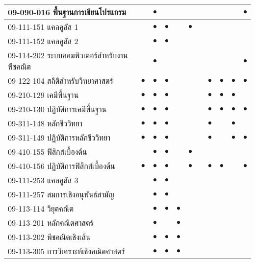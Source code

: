 \begin{longtable}{|>{\raggedright}p{}|c|c|c|c|c|c|c|c|c|c|}
	09-090-016 พื้นฐานการเขียนโปรแกรม&&{\Large$\bullet$}&&&&&&&&{\Large$\bullet$}\\
	\hline
	09-111-151 แคลคูลัส 1&&{\Large$\bullet$}&{\Large$\bullet$}&&{\Large$\bullet$}&&&&&\\
	\hline
	09-111-152 แคลคูลัส 2
	&&{\Large$\bullet$}&{\Large$\bullet$}&&&&&&&\\
	\hline
	09-114-202 ระบบคอมพิวเตอร์สำหรับงานพีชคณิต&&{\Large$\bullet$}&&&&&&&&{\Large$\bullet$}\\
	\hline
	09-122-104 สถิติสำหรับวิทยาศาสตร์&{\Large$\bullet$}&{\Large$\bullet$}&{\Large$\bullet$}&&&&{\Large$\bullet$}&{\Large$\bullet$}&{\Large$\bullet$}&{\Large$\bullet$}\\
	\hline
	09-210-129 เคมีพื้นฐาน&{\Large$\bullet$}&{\Large$\bullet$}&{\Large$\bullet$}&&&&{\Large$\bullet$}&{\Large$\bullet$}&{\Large$\bullet$}&\\
	\hline
	09-210-130 ปฏิบัติการเคมีพื้นฐาน&{\Large$\bullet$}&{\Large$\bullet$}&{\Large$\bullet$}&&&&{\Large$\bullet$}&{\Large$\bullet$}&{\Large$\bullet$}&{\Large$\bullet$}\\
	\hline
	09-311-148 หลักชีววิทยา&{\Large$\bullet$}&{\Large$\bullet$}&{\Large$\bullet$}&&&&{\Large$\bullet$}&&{\Large$\bullet$}&\\
	\hline
	09-311-149 ปฏิบัติการหลักชีววิทยา&{\Large$\bullet$}&{\Large$\bullet$}&{\Large$\bullet$}&&&&{\Large$\bullet$}&&{\Large$\bullet$}&{\Large$\bullet$}\\
	\hline
	09-410-155 ฟิสิกส์เบื้องต้น&&{\Large$\bullet$}&{\Large$\bullet$}&&{\Large$\bullet$}&&&&&\\
	\hline
	09-410-156 ปฏิบัติการฟิสิกส์เบื้องต้น&{\Large$\bullet$}&{\Large$\bullet$}&{\Large$\bullet$}&&{\Large$\bullet$}&&{\Large$\bullet$}&{\Large$\bullet$}&&{\Large$\bullet$}\\
	\hline
	09-111-253 แคลคูลัส 3&&{\Large$\bullet$}&{\Large$\bullet$}&&&&&&&\\
	\hline
	09-111-257 สมการเชิงอนุพันธ์สามัญ&&{\Large$\bullet$}&{\Large$\bullet$}&&&&&&&\\
	\hline
	09-113-114 วิยุตคณิต&&{\Large$\bullet$}&{\Large$\bullet$}&{\Large$\bullet$}&&&&&&\\
	\hline
	09-113-201 หลักคณิตศาสตร์&&{\Large$\bullet$}&&{\Large$\bullet$}&&&&&&\\
	\hline
	09-113-202 พีชคณิตเชิงเส้น&&{\Large$\bullet$}&{\Large$\bullet$}&{\Large$\bullet$}&&&&&&\\
	\hline
	09-113-305 การวิเคราะห์เชิงคณิตศาสตร์&&{\Large$\bullet$}&{\Large$\bullet$}&{\Large$\bullet$}&&&&&&\\

\end{longtable}
